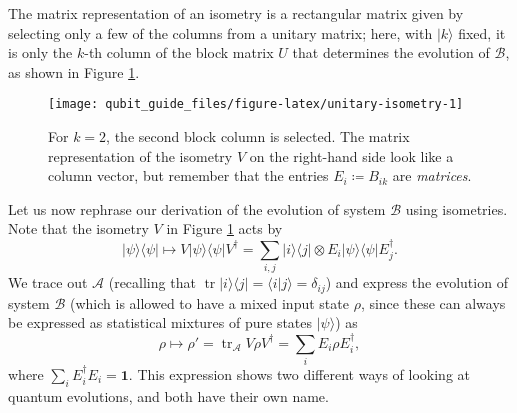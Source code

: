 \documentclass[fleqn]{article}
\begin{document}
The matrix representation of an isometry is a rectangular matrix given by selecting only a few of the columns from a unitary matrix;
here, with \(|k\rangle\) fixed, it is only the \(k\)-th column of the block matrix \(U\) that determines the evolution of \(\mathcal{B}\), as shown in Figure \ref{fig:unitary-isometry}.



\begin{figure}[H]

{\centering \texttt{[image: qubit\_guide\_files/figure-latex/unitary-isometry-1]} 

}

\caption{For \(k=2\), the second block column is selected. The matrix representation of the isometry \(V\) on the right-hand side look like a column vector, but remember that the entries \(E_i\coloneqq B_{ik}\) are \emph{matrices}.}\label{fig:unitary-isometry}
\end{figure}

Let us now rephrase our derivation of the evolution of system \(\mathcal{B}\) using isometries.
Note that the isometry \(V\) in Figure \ref{fig:unitary-isometry} acts by
\[
  |\psi\rangle\langle\psi|
  \longmapsto
  V|\psi\rangle\langle\psi|V^\dagger
  = \sum_{i,j} |i\rangle\langle j| \otimes E_i|\psi\rangle\langle\psi| E_j^\dagger.
\]
We trace out \(\mathcal{A}\) (recalling that \(\operatorname{tr}|i\rangle\langle j| = \langle i|j\rangle=\delta_{ij}\)) and express the evolution of system \(\mathcal{B}\) (which is allowed to have a mixed input state \(\rho\), since these can always be expressed as statistical mixtures of pure states \(|\psi\rangle\)) as
\[
  \rho
  \longmapsto
  \rho' = \operatorname{tr}_\mathcal{A} V\rho V^\dagger =\sum_i E_i\rho E_i^\dagger,
\]
where \(\sum_iE_i^\dagger E_i=\mathbf{1}\).
This expression shows two different ways of looking at quantum evolutions, and both have their own name.
\end{document}
